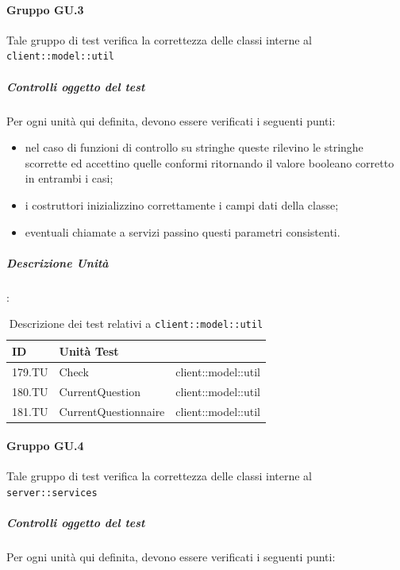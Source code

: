 \documentclass[12pt,a4paper]{article}
\begin{document}
\paragraph{Gruppo GU.3}
Tale gruppo di test verifica la correttezza delle classi interne al  \texttt{client::model::util}

\subparagraph{Controlli oggetto del test}
Per ogni unità  qui definita, devono essere verificati i seguenti punti:

\begin{itemize}
	\item nel caso di funzioni di controllo su stringhe queste rilevino le stringhe scorrette ed accettino quelle conformi ritornando il valore booleano corretto in entrambi i casi;
	\item i costruttori inizializzino correttamente i campi dati della classe;
	\item eventuali chiamate a servizi passino  questi parametri consistenti.
\end{itemize}

\subparagraph{Descrizione Unità}:

\begin{table}[H]
	\begin{center}
		\begin{tabular}{p{} p{} p{}}
			\toprule
			\textbf{ID}   & \textbf{Unità Test}	& \textbf{\mgls{package}} \\ \midrule
			\midrule
			179.TU & Check & client::model::util\\ \midrule
			180.TU & CurrentQuestion & client::model::util\\ \midrule
			181.TU & CurrentQuestionnaire & client::model::util\\ \midrule
			
			\bottomrule
		\end{tabular}
	\end{center}
	\caption{Descrizione dei test relativi a \texttt{client::model::util}}
\end{table}

\paragraph{Gruppo GU.4}
Tale gruppo di test verifica la correttezza delle classi interne al  \texttt{server::services}

\subparagraph{Controlli oggetto del test}
Per ogni unità  qui definita, devono essere verificati i seguenti punti:
\end{document}
